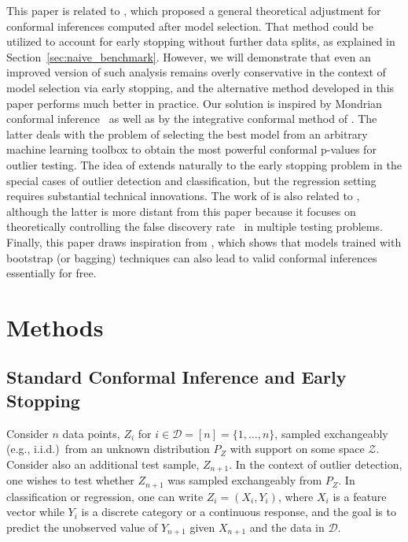 This paper is related to \citet{efficiency_first_cp}, which proposed a general theoretical adjustment for conformal inferences computed after model selection. That method could be utilized to account for early stopping without further data splits, as explained in Section~\ref{sec:naive_benchmark}. However, we will demonstrate that even an improved version of such analysis remains overly conservative in the context of model selection via early stopping, and the alternative method developed in this paper performs much better in practice.
Our solution is inspired by Mondrian conformal inference~\citep{vovk2003mondrian} as well as by the integrative conformal method of \citet{Liang_2022_integrative_p_val}. The latter deals with the problem of selecting the best model from an arbitrary machine learning toolbox  to obtain the most powerful conformal p-values for outlier testing. The idea of \citet{Liang_2022_integrative_p_val} extends naturally to the early stopping problem in the special cases of outlier detection and classification, but the regression setting requires substantial technical innovations.
The work of \citet{Liang_2022_integrative_p_val} is also related to \citet{marandon2022machine}, although the latter is more distant from this paper because it focuses on theoretically controlling the false discovery rate~\citep{benjamini1995controlling}  in multiple testing problems.
Finally, this paper draws inspiration from \citet{kim2020predictive}, which shows that models trained with bootstrap (or bagging) techniques can also lead to valid conformal inferences essentially for free.


\section{Methods} \label{sec:ces}

\subsection{Standard Conformal Inference and Early Stopping} \label{sec:setup}

Consider $n$ data points, $Z_i$ for $i \in \mathcal{D} = [n] = \{1,\ldots,n\}$, sampled exchangeably (e.g., i.i.d.)~from an unknown distribution $P_{Z}$ with support on some space $\mathcal{Z}$. Consider also an additional test sample, $Z_{n+1}$. 
In the context of outlier detection, one wishes to test whether $Z_{n+1}$ was sampled exchangeably from $P_Z$.
In classification or regression, one can write $Z_i = (X_i, Y_i)$, where $X_i$ is a feature vector while $Y_i$ is a discrete category or a continuous response, and the goal is to predict the unobserved value of $Y_{n+1}$ given $X_{n+1}$ and the data in $\mathcal{D}$.

